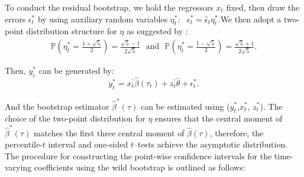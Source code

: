 \documentclass[12pt,a4paper]{article}
\begin{document}
To conduct the residual bootstrap, we hold the regressors $x_t$ fixed, then draw the errors $\epsilon^{*}_t$  by using auxiliary random variables $\eta^{*}_t$: \, $\epsilon_{t}^{*}=\widehat{\epsilon}_{t} \eta_{t}^{*}$.We then adopt a two-point distribution structure for $\eta$ as suggested by \cite{mammen1993bootstrap}:
$$\begin{array}{l}
\mathbb{P}\left(\eta_{t}^{*}=\frac{1+\sqrt{5}}{2}\right)=\frac{\sqrt{5}-1}{2 \sqrt{5}}  \ \ \ \mbox{and} \ \ \ \mathbb{P}\left(\eta_{t}^{*}=\frac{1-\sqrt{5}}{2}\right)=\frac{\sqrt{5}+1}{2 \sqrt{5}}.
\end{array}$$

Then, $y^{*}_i$ can be generated by:
$$
y_{t}^{*}=x^{\prime}_{t}\hat\beta(\tau_{t}) +z_t^{\prime}\widehat{\theta}+ \epsilon_{t}^{*}.
$$

And the bootstrap estimator $\widehat{\beta}^{*}(\tau)$ can be estimated using ($y^{*}_t$,$x^{*}_t$, $z^{*}_t$). The choice of the two-point distribution for $\eta$ ensures that the central moment of $\widehat{\beta}^{*}(\tau)$ matches the first three central moment of $\widehat{\beta}(\tau)$, therefore, the percentile-$t$ interval and one-sided $t$--tests achieve the asymptotic distribution. 
%	
%	
The procedure for constructing the point-wise confidence intervals for the time-varying coefficients using the wild bootstrap is outlined as follows:
\end{document}
